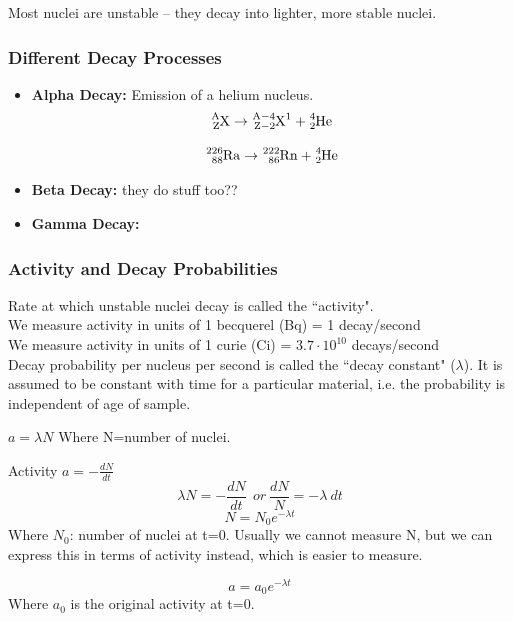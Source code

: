 \documentclass[class=article,crop=false]{standalone}
\begin{document}
Most nuclei are unstable -- they decay into lighter, more stable nuclei.

\subsubsection{Different Decay Processes}

\begin{itemize}
	\item \textbf{Alpha Decay:} Emission of a helium nucleus. \\
		$$ \ce{^A_ZX} \rightarrow \ce{^{A-4}_{Z-2}X^1} + \ce{^4_2He} $$
		\begin{question}
			$$ \ce{^{226}_{88}Ra} \rightarrow \ce{^{222}_{86}Rn} + \ce{^4_2He} $$
		\end{question}
	\item \textbf{Beta Decay:} they do stuff too??
	\item \textbf{Gamma Decay:}
\end{itemize}

\subsubsection{Activity and Decay Probabilities}

Rate at which unstable nuclei decay is called the ``activity". \\

We measure activity in units of 1 becquerel (Bq) = 1 decay/second \\
We measure activity in units of 1 curie (Ci) = $ 3.7 \cdot 10^{10} $ decays/second \\

Decay probability per nucleus per second is called the ``decay constant" ($\lambda$). It is assumed to be constant with time for a particular material, i.e. the probability is independent of age of sample.

\begin{result}
	$ a = \lambda N $ Where N=number of nuclei.
\end{result}

\begin{result}
	Activity $a = - \frac{dN}{dt} $
	$$ \lambda N = - \frac{dN}{dt}\ \ or\ \frac{dN}{N} = -\lambda\ dt $$
	$$ N = N_0 e^{-\lambda t} $$
	Where $N_0$: number of nuclei at t=0.
	Usually we cannot measure N, but we can express this in terms of activity instead, which is easier to measure.

	$$ a = a_0 e^{-\lambda t} $$
	Where $a_0$ is the original activity at t=0.
\end{result}
\end{document}
